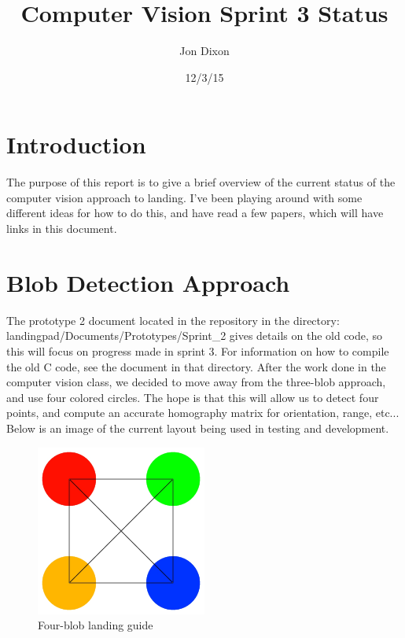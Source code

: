 \documentclass{article}
\title{Computer Vision Sprint 3 Status}
\date{12/3/15}
\author{Jon Dixon}
\begin{document}
	\maketitle
	\newpage
	
	\section{Introduction}
	The purpose of this report is to give a brief overview of the current status of the computer vision approach to landing. I've been playing around with some different ideas for how to do this, and have read a few papers, which will have links in this document.
	
	\section{Blob Detection Approach}
	The prototype 2 document located in the repository in the directory: \hfill\hfill\linebreak landingpad/Documents/Prototypes/Sprint\_2 gives details on the old code, so this will focus on progress made in sprint 3. For information on how to compile the old C code, see the document in that directory. \hfill\hfill\linebreak\linebreak
	After the work done in the computer vision class, we decided to move away from the three-blob approach, and use four colored circles. The hope is that this will allow us to detect four points, and compute an accurate homography matrix for orientation, range, etc... Below is an image of the current layout being used in testing and development.
	
	\begin{figure}[h]
		\centering
		\includegraphics[width=0.5\textwidth]{landing_guide_small_x.jpg}
		\caption{Four-blob landing guide}
	\end{figure}
	
\end{document}
